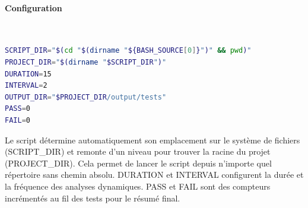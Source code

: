 \paragraph{Configuration} \mbox{} \\
\begin{lstlisting}[language=bash, caption=Configuration run\_tests.sh]
SCRIPT_DIR="$(cd "$(dirname "${BASH_SOURCE[0]}")" && pwd)"
PROJECT_DIR="$(dirname "$SCRIPT_DIR")"
DURATION=15
INTERVAL=2
OUTPUT_DIR="$PROJECT_DIR/output/tests"
PASS=0
FAIL=0
\end{lstlisting}

Le script détermine automatiquement son emplacement sur le système de fichiers (SCRIPT\_DIR) et remonte d'un niveau pour trouver la racine du projet (PROJECT\_DIR). Cela permet de lancer le script depuis n'importe quel répertoire sans chemin absolu. DURATION et INTERVAL configurent la durée et la fréquence des analyses dynamiques. PASS et FAIL sont des compteurs incrémentés au fil des tests pour le résumé final.

